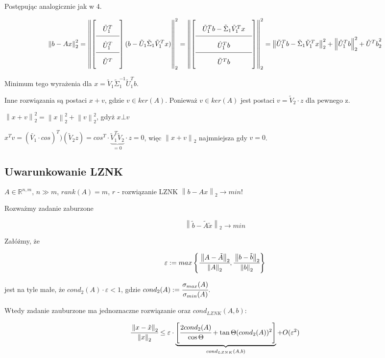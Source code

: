 \documentclass[hidelinks,a4paper,fleqn]{article}
\newcommand{\RR}{\mathbb{R}}
\newcommand{\ra}{\rightarrow}
\newcommand{\norm}[1]{\left\lVert#1\right\rVert}
\begin{document}
Postępując analogicznie jak w 4.

\[\arraycolsep=1em\def\arraystretch{2}
\norm{b - Ax}_2^2 = \norm{\left[ \begin{array}{c}
\tilde{U}_1^T \\ \hline
\hat{U}_1^T \\ \hline
\tilde{U}^T 
\end{array}\right] (b - \tilde{U}_1 \tilde{\Sigma}_1 \tilde{V}_1^Tx)}_2^2 = \norm{\left[\begin{array}{c}
\tilde{U}_1^Tb - \tilde{\Sigma}_1\tilde{V}_1^Tx \\ \hline
\hat{U}_1^T b\\ \hline
\tilde{U}^T b 
\end{array}\right]}_2^2 = 
\norm{\tilde{U}_1^Tb - \tilde{\Sigma}_1\tilde{V}_1^Tx}_2^2 +  \norm{\hat{U}_1^Tb}_2^2 + {\hat{U}^Tb}_2^2
\]

Minimum tego wyrażenia dla $x = \tilde{V}_1\tilde{\Sigma}_1^{-1} \tilde{U}_1^Tb$.

Inne rozwiązania są postaci $x+v$, gdzie $v \in ker(A)$. Ponieważ $v \in ker(A)$ jest postaci $v = \tilde{V}_2 \cdot z$ dla pewnego z.

$\norm{x + v}_2^2 = \norm{x}_2^2 + \norm{v}_2^2$, gdyż $x \bot v$

$x^Tv = (\tilde{V_1} \cdot cos)^T) (\tilde{V}_2z) = cos^T \cdot \underbrace{\tilde{V}_1^T\tilde{V}_2}_{=0}\cdot z = 0$, więc $\norm{x + v}_2$ najmniejsza gdy $v = 0$.

\subsection{Uwarunkowanie LZNK}

$A \in \RR^{n,m}$, $n \gg m$, $rank(A) = m$, $r$ - rozwiązanie LZNK $\norm{b - Ax}_2 \ra min!$

Rozważmy zadanie zaburzone

\[\norm{\tilde{b} - \tilde{A}\tilde{x}}_2 \ra min\]

Załóżmy, że

\[
	\varepsilon := max \left\{ \cfrac{\norm{A - \tilde{A}}_2}{\norm{A} _2}, \cfrac{\norm{b - \tilde{b}}_2}{\norm{b}_2} \right\}
\]

jest na tyle małe, że $cond_2(A) \cdot \varepsilon < 1$, gdzie $cond_2(A) := \cfrac{\sigma_{max}(A)}{\sigma_{min}(A)}$.

Wtedy zadanie zauburzone ma jednoznaczne rozwiązanie oraz $cond_{LZNK}(A, b)$:

\[
	\cfrac{\norm{x - \tilde{x}}_2}{\norm{x}_2} \leq \varepsilon \cdot \underbrace{\left[ \cfrac{2 cond_2(A)}{\cos{\Theta}} + \tan{\Theta}(cond_2(A))^2 \right]}_{cond_{LZNK}(A, b)} + O(\varepsilon^2)
\]
\end{document}
